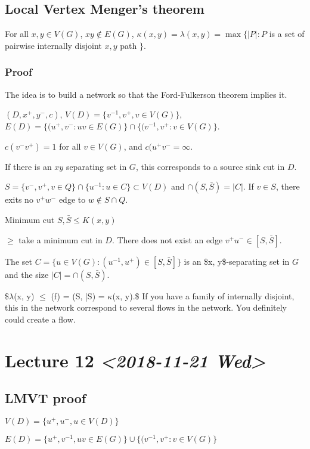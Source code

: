 \documentclass[11pt]{article}
\def\max{\operatorname{max}}
\begin{document}
{\subsection{Local Vertex Menger's theorem}
\label{sec:orgc8829a0}
For all \(x, y \in V(G)\), \(xy\notin E(G)\), \(\kappa(x, y) = \lambda(x, y) =
   \max\{\vert P \vert \colon P\) is a set of pairwise internally disjoint \(x, y\)
path \(\}\).
\subsubsection{Proof}
\label{sec:orgff75c41}
The idea is to build a network so that the Ford-Fulkerson theorem implies
it.

\((D, x^{+}, y^{-}, c)\), \(V(D) = \{v^{-1}, v^{+}, v\in V(G)\}\), \(E(D)
    =\{(u^{+}, v^{-} \colon uv \in E(G)\} \cap \{(v^{-1}, v^{+} \colon v \in
    V(G)\}\).

\(c(v^-v^{+}) = 1\) for all \(v \in V(G)\), and \(c(u^{+}v^{-} = \infty\).

If there is an \(xy\) separating set in \(G\), this corresponds to a source sink
cut in \(D\).

\(S = \{v^-, v^{+}, v\in Q\} \cap \{u^{-1}\colon u \in C\} \subset V(D)\) and
\(\cap (S, \bar{S}) = \vert C \vert\). If \(v \in S\), there exits no
\(v^{+}w^{-}\) edge to \(w \notin S \cap Q\).

Minimum cut \(S, \bar{S} \le K(x, y)\)

\(\ge\) take a minimum cut in \(D\). There does not exist an edge \(v^{+}u^{-}
    \in [S, \bar{S}]\).

The set \(C = \{u \in V(G) \colon (u^{-1}, u^{+}) \in [S, \bar{S}]\}\) is an
\$x, y\$-separating set in \(G\) and the size \(\vert C \vert = \cap(S,
    \bar{S})\).

\$\(\lambda\)(x, y) \(\le\) \maxval(f) = \mincap(S, \bar{S}) = \(\kappa\)(x, y).\$ If you
have a family of internally disjoint, this in the network correspond to
several flows in the network. You definitely could create a flow.
\section{Lecture 12 \textit{<2018-11-21 Wed>}}
\label{sec:orgd52ecfd}
\subsection{LMVT proof}
\label{sec:orge4cb4b5}
\(V(D) = \{u^{+}, u^{-}, u \in V(D)\}\)

\(E(D) = \{u^{+}, v^{-1}, uv \in E(G)\} \cup \{(v^{-1}, v^{+}\colon v\in
   V(G)\}\)

}
\end{document}
